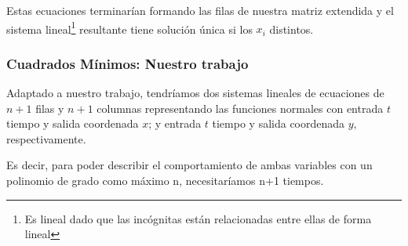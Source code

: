 Estas ecuaciones terminarían formando las filas de nuestra matriz extendida y el sistema
lineal\footnote{Es lineal dado que las incógnitas están relacionadas entre ellas de forma lineal}
resultante tiene solución única si los $x_i$ distintos.

\subsubsection{Cuadrados Mínimos: Nuestro trabajo}

Adaptado a nuestro trabajo, tendríamos dos sistemas lineales de ecuaciones de $n+1$ filas y $n+1$
columnas representando las funciones normales con entrada $t$ tiempo y salida coordenada $x$; y
entrada $t$ tiempo y salida coordenada $y$, respectivamente.

Es decir, para poder describir el comportamiento de ambas variables con un polinomio de grado como
máximo n, necesitaríamos n+1 tiempos.

